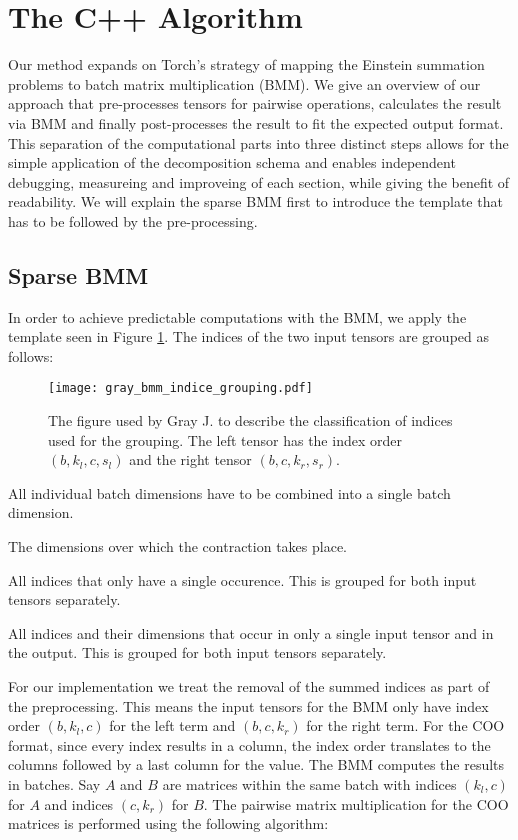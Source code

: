 \section{The C++ Algorithm}
Our method expands on Torch's strategy of mapping the Einstein summation problems to batch matrix
multiplication (BMM). We give an overview of our approach that pre-processes tensors for pairwise
operations, calculates the result via BMM and finally post-processes the result to fit the expected
output format. This separation of the computational parts into three distinct steps allows for the
simple application of the decomposition schema and enables independent debugging, measureing and
improveing of each section, while giving the benefit of readability. We will explain the sparse
BMM first to introduce the template that has to be followed by the pre-processing.

\subsection{Sparse BMM}
In order to achieve predictable computations with the BMM, we apply the template seen in Figure
\ref{fig:bmm:template}. The indices of the two input tensors are grouped as follows:

\begin{figure}[H]
    \centering
    \texttt{[image: gray\_bmm\_indice\_grouping.pdf]}
    \caption{The figure used by Gray J. \cite{jcmgray}  to describe the classification of indices
        used for the grouping. The left tensor has the index order $(b, k_l, c, s_l)$ and the right
        tensor $(b, c, k_r, s_r)$.}
    \label{fig:bmm:template}
\end{figure}
%
\begin{description}[leftmargin=!,labelwidth=\widthof{\bfseries Contracted Indices (c)}]
    \item [Batch Indices (b)] All individual batch dimensions have to be combined into a single
          batch dimension.
    \item [Contracted Indices (c)] The dimensions over which the contraction takes place.
    \item [Summed Indices (s)] All indices that only have a single occurence. This is grouped for
          both input tensors separately.
    \item [Kept Indices (k)] All indices and their dimensions that occur in only a single input
          tensor and in the output. This is grouped for both input tensors separately.
\end{description}
%
For our implementation we treat the removal of the summed indices as part of the preprocessing.
This means the input tensors for the BMM only have index order $(b, k_l, c)$ for the left term and
$(b, c, k_r)$ for the right term. For the COO format, since every index results in a column,
the index order translates to the columns followed by a last column for the value. The BMM
computes the results in batches. Say $A$ and $B$ are matrices within the same batch with indices
$(k_l, c)$ for $A$ and indices $(c, k_r)$ for $B$. The pairwise matrix multiplication for the COO
matrices is performed using the following algorithm:

